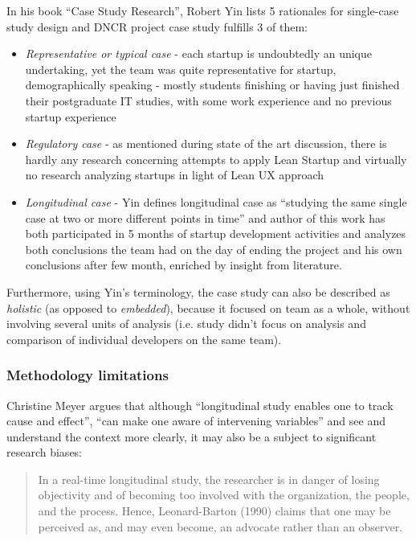 \documentclass{article}
\begin{document}
In his book ``Case Study Research''\cite{yin2013case}, Robert Yin lists 5 rationales for single-case study design and DNCR project case study fulfills 3 of them:
\begin{itemize}
\item \textit{Representative or typical case} - each startup is undoubtedly an unique undertaking, yet the team was quite representative for startup, demographically speaking - mostly students finishing or having just finished their postgraduate IT studies, with some work experience and no previous startup experience
\item \textit{Regulatory case} - as mentioned during state of the art discussion, there is hardly any research concerning attempts to apply Lean Startup and virtually no research analyzing startups in light of Lean UX approach
\item \textit{Longitudinal case} - Yin defines longitudinal case as ``studying the same single case at two or more different points in time'' and author of this work has both participated in 5 months of startup development activities and analyzes both conclusions the team had on the day of ending the project and his own conclusions after few month, enriched by insight from literature.
\end{itemize}

Furthermore, using Yin's terminology, the case study can also be described as \textit{holistic} (as opposed to \textit{embedded}), because it focused on team as a whole, without involving several units of analysis (i.e. study didn't focus on analysis and comparison of individual developers on the same team).

\subsubsection{Methodology limitations}
Christine Meyer \cite{meyer2001case} argues that although ``longitudinal study enables one to track cause and effect'', ``can make one aware of intervening variables'' and see and understand the context more clearly, it may also be a subject to significant research biases:
\begin{quote}
In a real-time longitudinal study, the researcher is in danger of losing objectivity and of becoming too involved with the organization, the people, and the process. Hence, Leonard-Barton (1990) claims that one may be perceived as, and may even become, an advocate rather than an observer.
\end{quote}
\end{document}
